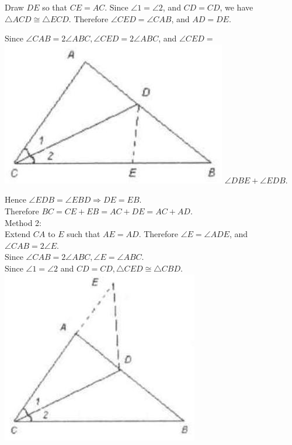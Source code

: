 \documentclass[10pt]{article}
\begin{document}
Draw \(D E\) so that \(C E=A C\). Since \(\angle 1=\angle 2\), and \(C D=C D\), we have \(\triangle A C D \cong \triangle E C D\). Therefore \(\angle C E D=\angle C A B\), and \(A D=D E\).

Since \(\angle C A B=2 \angle A B C, \angle C E D=2 \angle A B C\), and \(\angle C E D=\)\\
\includegraphics[max width=\textwidth]{2025_04_17_97bc1f7e44d93c271a88g-056(1)} \(\angle D B E+\angle E D B\).

Hence \(\angle E D B=\angle E B D \Rightarrow D E=E B\).\\
Therefore \(B C=C E+E B=A C+D E=A C+A D\).\\
Method 2:\\
Extend \(C A\) to \(E\) such that \(A E=A D\). Therefore \(\angle E=\angle A D E\), and \(\angle C A B=2 \angle E\).\\
Since \(\angle C A B=2 \angle A B C, \angle E=\angle A B C\).\\
Since \(\angle 1=\angle 2\) and \(C D=C D, \triangle C E D \cong \triangle C B D\).\\
\includegraphics[max width=\textwidth, center]{2025_04_17_97bc1f7e44d93c271a88g-056(2)}
\end{document}
